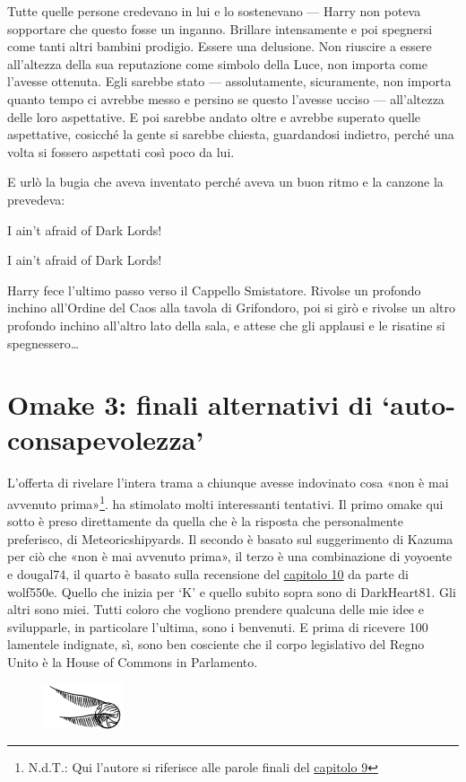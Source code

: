 Tutte quelle persone credevano in lui e lo sostenevano — Harry non poteva sopportare che questo fosse un inganno. Brillare intensamente e poi spegnersi come tanti altri bambini prodigio. Essere una delusione. Non riuscire a essere all’altezza della sua reputazione come simbolo della Luce, non importa come l’avesse ottenuta. Egli sarebbe stato — assolutamente, sicuramente, non importa quanto tempo ci avrebbe messo e persino se questo l’avesse ucciso — all’altezza delle loro aspettative. E poi sarebbe andato oltre e avrebbe superato quelle aspettative, cosicché la gente si sarebbe chiesta, guardandosi indietro, perché una volta si fossero aspettati così poco da lui.

E urlò la bugia che aveva inventato perché aveva un buon ritmo e la canzone la prevedeva:

I ain’t afraid of Dark Lords!

I ain’t afraid of Dark Lords!

Harry fece l’ultimo passo verso il Cappello Smistatore. Rivolse un profondo inchino all’Ordine del Caos alla tavola di Grifondoro, poi si girò e rivolse un altro profondo inchino all’altro lato della sala, e attese che gli applausi e le risatine si spegnessero…



\section{Omake 3: finali alternativi di ‘auto-consapevolezza’}

L’offerta di rivelare l’intera trama a chiunque avesse indovinato cosa «non è mai avvenuto prima»\footnote{N.d.T.: Qui l’autore si riferisce alle parole finali del \hyperref[capitolo:9]{capitolo 9}}. ha stimolato molti interessanti tentativi. Il primo omake qui sotto è preso direttamente da quella che è la risposta che personalmente preferisco, di Meteoricshipyards. Il secondo è basato sul suggerimento di Kazuma per ciò che «non è mai avvenuto prima», il terzo è una combinazione di yoyoente e dougal74, il quarto è basato sulla recensione del \hyperref[capitolo:10]{capitolo 10} da parte di wolf550e. Quello che inizia per ‘K’ e quello subito sopra sono di DarkHeart81. Gli altri sono miei. Tutti coloro che vogliono prendere qualcuna delle mie idee e svilupparle, in particolare l’ultima, sono i benvenuti. E prima di ricevere 100 lamentele indignate, sì, sono ben cosciente che il corpo legislativo del Regno Unito è la House of Commons in Parlamento.

\begin{figure}[h]
	\includegraphics[scale=0.4]{boccino.png}
	\centering
\end{figure}

